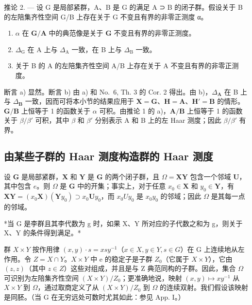 推论 2. --- 设 G 是局部紧群，A、B 是 G 的满足 A ⊃ B 的闭子群。假设关于 B 的左陪集齐性空间 G/B 上存在关于 G 不变且有界的非零正测度 α。

\begin{enumerate}
\def\labelenumi{\alph{enumi})}
\item
  \(\alpha\) 在 \(\mathbf{G} / \mathbf{A}\) 中的典范像是关于 \(\mathbf{G}\) 不变且有界的非零正测度。
\item
  \(\Delta_{\mathrm{G}}\) 在 A 上与 \(\Delta_{\mathrm{A}}\) 一致，在 B 上与 \(\Delta_{\mathrm{B}}\) 一致。
\item
  关于 B 的 A 的左陪集齐性空间 A/B 上存在关于 A 不变且有界的非零正测度。
\end{enumerate}

断言 a) 显然。断言 b) 由 a) 和 No.~6, Th. 3 的 Cor. 2 得出。由 b)，\(\Delta_{\mathbf{A}}\) 在 B 上与 \(\Delta_{\mathbf{B}}\) 一致，因而可将本小节的结果应用于 \(\mathbf{X} = \mathbf{G}\)、\(\mathbf{H} = \mathbf{A}\)、\(\mathbf{H}' = \mathbf{B}\) 的情形。\(\mathbf{G} / \mathbf{B}\) 上恒等于 1 的函数关于 \(\alpha\) 可积。由推论 1 的 a)，\(\mathbf{A} / \mathbf{B}\) 上恒等于 1 的函数关于 \(\beta / \beta'\) 可积，其中 \(\beta\) 和 \(\beta'\) 分别表示 A 和 B 上的左 Haar 测度；因此 \(\beta / \beta'\) 有界。

\subsection{由某些子群的 Haar 测度构造群的 Haar 测度}

设 \(\mathbf{G}\) 是局部紧群，\(\mathbf{X}\) 和 \(\mathbf{Y}\) 是 \(\mathbf{G}\) 的两个闭子群，且 \(\Omega = \mathbf{XY}\) 包含一个邻域 \(\mathbf{U}\)，其中包含 \(e\)。则 \(\Omega\) 是 \(\mathbf{G}\) 中的开集；事实上，对于任意 \(x_0 \in \mathbf{X}\) 和 \(y_0 \in \mathbf{Y}\)，有 \(\mathbf{XY} = (x_0\mathbf{X})(\mathbf{Y}y_0) \supset x_0\mathbf{U}y_0\)，而 \(x_{0}Uy_{0}\) 是 \(x_{0}y_{0}\) 的邻域；因此 \(\Omega\) 是其每一点的邻域。

*当 G 是李群且其李代数为 g 时，如果 X、Y 所对应的子代数之和为 g，则关于 X、Y 的条件得到满足。*

群 \(X \times Y\) 按作用律 \((x, y) \cdot s = xsy^{-1}\)（\(x \in X, y \in Y, s \in G\)）在 G 上连续地从左作用。令 \(Z = X \cap Y\)。\(X \times Y\) 中 e 的稳定子是子群 \(Z_{0}\)（它属于 \(X \times Y\)），它由 \((z, z)\)（其中 \(z \in Z\)）这些对组成，并且是与 Z 典范同构的子群。因此，集合 \(\Omega\) 可识别为左陪集齐性空间 \((X \times Y)/Z_{0}\)；更准确地说，映射 \((x, y) \mapsto xy^{-1}\) 从 \(X \times Y\) 到 \(\Omega\)，通过取商定义了从 \((X \times Y)/Z_{0}\) 到 \(\Omega\) 的连续双射。我们假设该映射是同胚。（当 G 在无穷远处可数时尤其如此：参见 App. I。）

